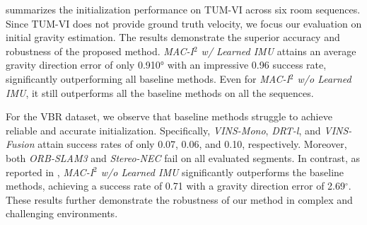  summarizes the initialization performance on TUM-VI across six room sequences. Since TUM-VI does not provide ground truth velocity, we focus our evaluation on initial gravity estimation. The results demonstrate the superior accuracy and robustness of the proposed method. \textit{MAC-I$^2$ w/ Learned IMU} attains an average gravity direction error of only 0.910$\si{\degree}$ with an impressive 0.96 success rate, significantly outperforming all baseline methods. Even for \textit{MAC-I$^2$ w/o Learned IMU}, it still outperforms all the baseline methods on all the sequences.

For the VBR dataset, we observe that baseline methods struggle to achieve reliable and accurate initialization. Specifically, \textit{VINS-Mono}, \textit{DRT-l}, and \textit{VINS-Fusion} attain success rates of only 0.07, 0.06, and 0.10, respectively. Moreover, both \textit{ORB-SLAM3} and \textit{Stereo-NEC} fail on all evaluated segments. In contrast, as reported in , \textit{MAC-I$^2$ w/o Learned IMU} significantly outperforms the baseline methods, achieving a success rate of 0.71 with a gravity direction error of 2.69$^\circ$. These results further demonstrate the robustness of our method in complex and challenging environments.

